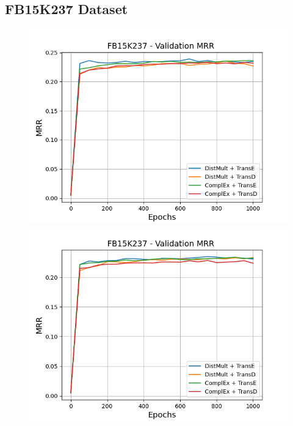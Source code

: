 \subsection{FB15K237 Dataset}

\begin{figure}
    \centering
    \begin{minipage}{.5\textwidth}
      \centering
      \includegraphics[width=0.9\linewidth]{figures/results/gan_train/not_pretrained/uncertainty/max_distribution/entropy/fb15k237/uncertainty_fb15k237_mrrs.png}
    \end{minipage}%
    \begin{minipage}{.5\textwidth}
      \centering
      \includegraphics[width=0.9\linewidth]{figures/results/gan_train/not_pretrained/uncertainty/max_distribution/least_confidence/fb15k237/uncertainty_fb15k237_mrrs.png}
    \end{minipage}

\end{figure}
